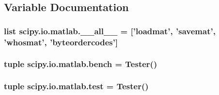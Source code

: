 \subsection{Variable Documentation}
\hypertarget{namespacescipy_1_1io_1_1matlab_ac81ea00218fe5b848367eaef0aa2b159}{}
\subsubsection[{\+\_\+\+\_\+all\+\_\+\+\_\+}]{\setlength{\rightskip}{0pt plus 5cm}list scipy.\+io.\+matlab.\+\_\+\+\_\+all\+\_\+\+\_\+ = \mbox{[}'loadmat', 'savemat', 'whosmat', 'byteordercodes'\mbox{]}}\label{namespacescipy_1_1io_1_1matlab_ac81ea00218fe5b848367eaef0aa2b159}
\hypertarget{namespacescipy_1_1io_1_1matlab_a82afe4cace6a0b53fab5265a997b1e20}{}
\subsubsection[{bench}]{\setlength{\rightskip}{0pt plus 5cm}tuple scipy.\+io.\+matlab.\+bench = Tester()}\label{namespacescipy_1_1io_1_1matlab_a82afe4cace6a0b53fab5265a997b1e20}
\hypertarget{namespacescipy_1_1io_1_1matlab_a8a23168bc23df308726c9f0ee10b3a28}{}
\subsubsection[{test}]{\setlength{\rightskip}{0pt plus 5cm}tuple scipy.\+io.\+matlab.\+test = Tester()}\label{namespacescipy_1_1io_1_1matlab_a8a23168bc23df308726c9f0ee10b3a28}
